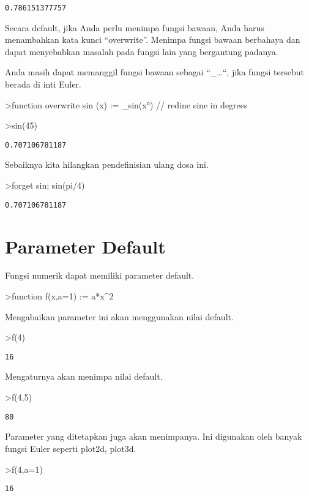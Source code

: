 \documentclass[
]{book}
\begin{document}
\begin{verbatim}
0.786151377757
\end{verbatim}

Secara default, jika Anda perlu menimpa fungsi bawaan, Anda harus menambahkan kata kunci ``overwrite''. Menimpa fungsi bawaan berbahaya dan dapat menyebabkan masalah pada fungsi lain yang bergantung padanya.

Anda masih dapat memanggil fungsi bawaan sebagai ``\_\ldots``, jika fungsi tersebut berada di inti Euler.

\textgreater function overwrite sin (x) := \_sin(x°) // redine sine in degrees

\textgreater sin(45)

\begin{verbatim}
0.707106781187
\end{verbatim}

Sebaiknya kita hilangkan pendefinisian ulang dosa ini.

\textgreater forget sin; sin(pi/4)

\begin{verbatim}
0.707106781187
\end{verbatim}

\section{Parameter Default}\label{parameter-default}

Fungsi numerik dapat memiliki parameter default.

\textgreater function f(x,a=1) := a*x\^{}2

Mengabaikan parameter ini akan menggunakan nilai default.

\textgreater f(4)

\begin{verbatim}
16
\end{verbatim}

Mengaturnya akan menimpa nilai default.

\textgreater f(4,5)

\begin{verbatim}
80
\end{verbatim}

Parameter yang ditetapkan juga akan menimpanya. Ini digunakan oleh banyak fungsi Euler seperti plot2d, plot3d.

\textgreater f(4,a=1)

\begin{verbatim}
16
\end{verbatim}
\end{document}
